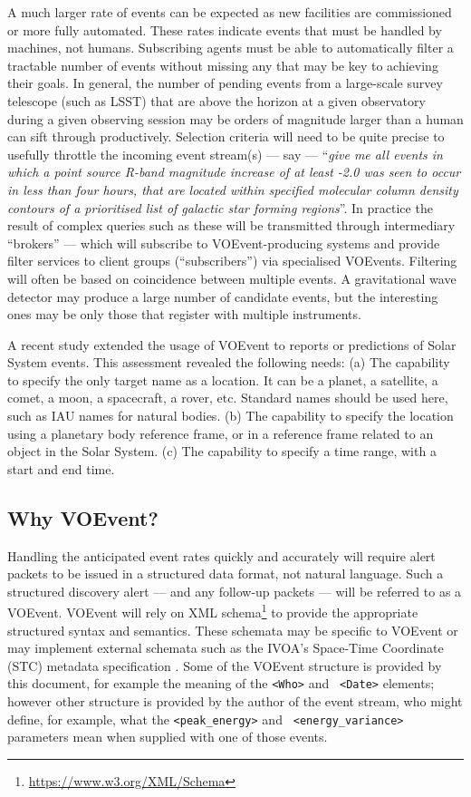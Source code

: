 \documentclass[11pt,a4paper]{ivoa}
\begin{document}
A much larger rate of events can be expected as new facilities are commissioned
or more fully automated. These rates indicate events that must be handled by
machines, not humans. Subscribing agents must be able to automatically filter a
tractable number of events without missing any that may be key to achieving 
their goals. In general, the number of pending events from a large-scale survey 
telescope (such as LSST) that are above the horizon at a given observatory 
during a given observing session may be orders of magnitude larger than a human 
can sift through productively. Selection criteria will need to be quite precise 
to usefully throttle the incoming event stream(s) --- say --- ``\emph{give me 
all events in which a point source R-band magnitude increase of at least -2.0 
was seen to occur in less than four hours, that are located within specified 
molecular column density contours of a prioritised list of galactic star forming
regions}''. In practice the result of complex queries such as these will be
transmitted through intermediary ``brokers'' --- which will subscribe to
VOEvent-producing systems and provide filter services to client groups
(``subscribers'') via specialised VOEvents. Filtering will often be based on
coincidence between multiple events. A gravitational wave detector may produce
a large number of candidate events, but the interesting ones may be only those
that register with multiple instruments.

A recent study \citep{2018arXiv181112680C} extended the usage of VOEvent to
reports or predictions of Solar System events. This assessment revealed the
following needs: (a) The capability to specify the only target name as a
location. It can be a planet, a satellite, a comet, a moon, a spacecraft, a
rover, etc. Standard names should be used here, such as IAU names for natural
bodies. (b) The capability to specify the location using a planetary body
reference frame, or in a reference frame related to an object in the Solar
System. (c) The capability to specify a time range, with a start and end time.

\subsection{Why VOEvent?}

Handling the anticipated event rates quickly and accurately will require alert 
packets to be issued in a structured data format, not natural language. Such a 
structured discovery alert --- and any follow-up packets --- will be referred 
to as a VOEvent. VOEvent will rely on XML schema\footnote{
\url{https://www.w3.org/XML/Schema}} to provide the appropriate structured
syntax and semantics. These schemata may be specific to VOEvent or may implement
external schemata such as the IVOA's Space-Time Coordinate (STC) metadata
specification \citep{2007ivoa.spec.1030R}. Some of the VOEvent structure is
provided by this document, for example the meaning of the {\tt <Who>} and {\tt
<Date>} elements; however other structure is provided by the author of the event
stream, who might define, for example, what the {\tt <peak\_energy>} and {\tt
<energy\_variance>} parameters mean when supplied with one of those events.
\end{document}
